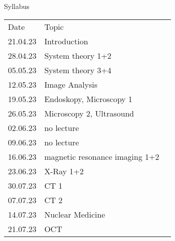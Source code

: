 \begin{frame}[c]{Syllabus}
\begin{table}[]
\begin{tabular}{rll}
\multicolumn{1}{l}{Date} & \multicolumn{1}{l}{Topic}      & \multicolumn{1}{c}{} \\
21.04.23                 & Introduction                   &                      \\
28.04.23                 & System theory 1+2              &                      \\
05.05.23                 & System theory  3+4             &                      \\
12.05.23                 & Image Analysis                 &                      \\
19.05.23                 & Endoskopy, Microscopy 1       &                      \\
26.05.23                 & Microscopy 2, Ultrasound       &                      \\
02.06.23                 & no lecture                &                      \\
09.06.23                 & no lecture                      &                      \\
16.06.23                 & magnetic resonance imaging 1+2       &                      \\
23.06.23                 & X-Ray 1+2  &                      \\
30.07.23                 & CT 1                           &                      \\
07.07.23                 & CT 2                           &                      \\
14.07.23                 & Nuclear Medicine                         &                      \\
21.07.23                 & OCT          &                     
\end{tabular}
\end{table}
\end{frame}

